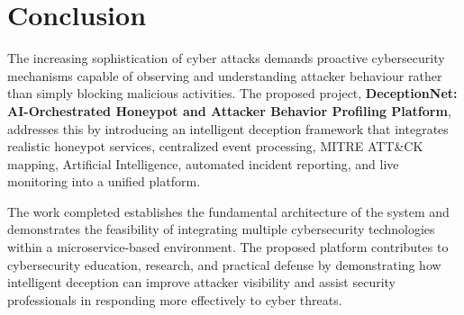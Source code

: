 \documentclass[12pt,a4paper]{report}
\begin{document}
\section{Conclusion}
The increasing sophistication of cyber attacks demands proactive cybersecurity mechanisms capable of observing and understanding attacker behaviour rather than simply blocking malicious activities. The proposed project, \textbf{DeceptionNet: AI-Orchestrated Honeypot and Attacker Behavior Profiling Platform}, addresses this by introducing an intelligent deception framework that integrates realistic honeypot services, centralized event processing, MITRE ATT\&CK mapping, Artificial Intelligence, automated incident reporting, and live monitoring into a unified platform. 

The work completed establishes the fundamental architecture of the system and demonstrates the feasibility of integrating multiple cybersecurity technologies within a microservice-based environment. The proposed platform contributes to cybersecurity education, research, and practical defense by demonstrating how intelligent deception can improve attacker visibility and assist security professionals in responding more effectively to cyber threats.

\clearpage

\end{document}
